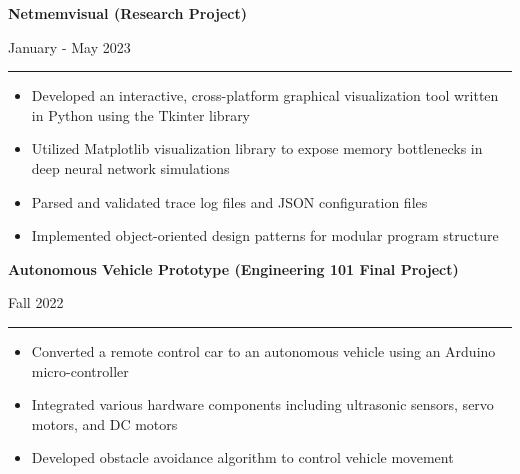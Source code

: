 \documentclass[letter]{article}
\begin{document}
    \noindent
    \begin{minipage}[c]{0.8\linewidth}
        \noindent \textbf{Netmemvisual (Research Project)}
    \end{minipage}
    \begin{minipage}[c]{0.19\linewidth}
        \begin{flushright}
            January - May 2023
        \end{flushright}
    \end{minipage}
    \vspace{4pt}
    \hrule
    \vspace{4pt}
    \noindent
    \begin{itemize}[noitemsep, topsep=0pt]
        \item Developed an interactive, cross-platform graphical visualization tool written in Python using the Tkinter library
        \item Utilized Matplotlib visualization library to expose memory bottlenecks in deep neural network simulations
        \item Parsed and validated trace log files and JSON configuration files
        \item Implemented object-oriented design patterns for modular program structure
    \end{itemize}
    \medskip

    \noindent
    \begin{minipage}[c]{0.8\linewidth}
        \noindent \textbf{Autonomous Vehicle Prototype (Engineering 101 Final Project)}
    \end{minipage}
    \begin{minipage}[c]{0.19\linewidth}
        \begin{flushright}
            Fall 2022
        \end{flushright}
    \end{minipage}
    \vspace{4pt}
    \hrule
    \vspace{4pt}
    \noindent
    \begin{itemize}[noitemsep, topsep=0pt]
        \item Converted a remote control car to an autonomous vehicle using an Arduino micro-controller
        \item Integrated various hardware components including ultrasonic sensors, servo motors, and DC motors
        \item Developed obstacle avoidance algorithm to control vehicle movement
    \end{itemize}
    \medskip
\end{document}
